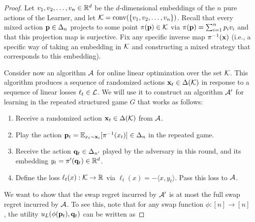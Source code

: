 \documentclass[final,12pt]{alt2025}
\begin{document}
\begin{lemma}\label{lem:structure-to-full}
\end{lemma}
\begin{proof}
Let $v_1, v_2, \dots, v_n \in \mathbb{R}^d$ be the $d$-dimensional embeddings of the $n$ pure actions of the Learner, and let $\mathcal{K} = \mathrm{conv}(\{v_1, v_2, \dots, v_n\})$. Recall that every mixed action $\mathbf{p} \in \Delta_n$ projects to some point $\pi(\mathbf{p}) \in \mathcal{K}$ via $\pi(\mathbf{p}) = \sum_{i=1}^{n} p_iv_i$ and that this projection map is surjective. Fix any specific inverse map $\pi^{-1}(\mathbf{x})$ (i.e., a specific way of taking an embedding in $\mathcal{K}$ and constructing a mixed strategy that corresponds to this embedding). 

Consider now an algorithm $\mathcal{A}$ for online linear optimization over the set $\mathcal{K}$. This algorithm produces a sequence of randomized actions $\mathbf{x}_t \in \Delta(\mathcal{K})$ in response to a sequence of linear losses $\ell_t \in \mathcal{L}$. We will use it to construct an algorithm $\mathcal{A}'$ for learning in the repeated structured game $G$ that works as follows:

\begin{enumerate}
    \item Receive a randomized action $\mathbf{x}_t \in \Delta(\mathcal{K})$ from $\mathcal{A}$.
    \item Play the action $\mathbf{p}_t = \mathbb{E}_{x_t \sim \mathbf{x}_t}[\pi^{-1}(x_t)] \in \Delta_n$ in the repeated game.
    \item Receive the action $\mathbf{q}_t \in \Delta_{n'}$ played by the adversary in this round, and its embedding $y_t = \pi'(\mathbf{q}_t) \in \mathbb{R}^{d}$. 
    \item Define the loss $\ell_t(x) : \mathcal{K} \rightarrow \mathbb{R}$ via $\ell_t(x) = -\langle x, y_t\rangle$. Pass this loss to $\mathcal{A}$. 
\end{enumerate}

We want to show that the swap regret incurred by $\mathcal{A}'$ is at most the full swap regret incurred by $\mathcal{A}$. To see this, note that for any swap function $\phi: [n] \rightarrow [n]$, the utility $u_L(\phi(\mathbf{p}_t), \mathbf{q}_t)$ can be written as


\end{proof}
\end{document}
